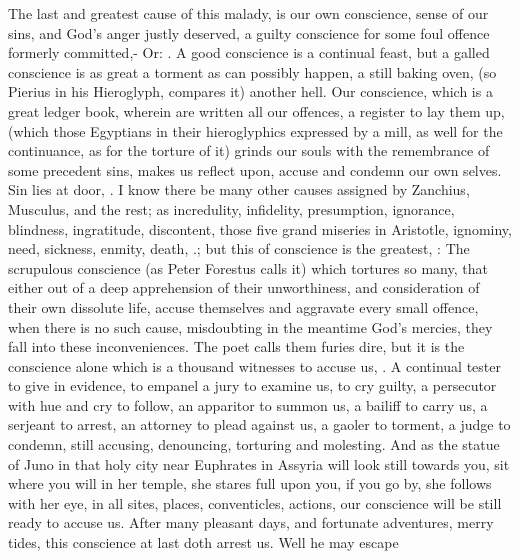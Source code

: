 {The last and greatest cause of this malady, is our own conscience,
sense of our sins, and God's anger justly deserved, a guilty conscience
for some foul offence formerly committed,- Or: . A good conscience is a continual feast, but a galled
conscience is as great a torment as can possibly happen, a still baking
oven, (so Pierius in his Hieroglyph, compares it) another hell. Our
conscience, which is a great ledger book, wherein are written all our
offences, a register to lay them up, (which those Egyptians in
their hieroglyphics expressed by a mill, as well for the continuance,
as for the torture of it) grinds our souls with the remembrance of some
precedent sins, makes us reflect upon, accuse and condemn our own
selves. Sin lies at door, \etc{}. I know there be many other causes
assigned by Zanchius, Musculus, and the rest; as incredulity,
infidelity, presumption, ignorance, blindness, ingratitude, discontent,
those five grand miseries in Aristotle, ignominy, need, sickness,
enmity, death, \etc{}.; but this of conscience is the greatest,
: The scrupulous
conscience (as Peter Forestus calls it) which tortures so many,
that either out of a deep apprehension of their unworthiness, and
consideration of their own dissolute life, accuse themselves and
aggravate every small offence, when there is no such cause, misdoubting
in the meantime God's mercies, they fall into these inconveniences. The
poet calls them furies dire, but it is the conscience alone which
is a thousand witnesses to accuse us,  . A continual tester to give in evidence, to empanel a
jury to examine us, to cry guilty, a persecutor with hue and cry to
follow, an apparitor to summon us, a bailiff to carry us, a serjeant to
arrest, an attorney to plead against us, a gaoler to torment, a judge
to condemn, still accusing, denouncing, torturing and molesting. And as
the statue of Juno in that holy city near Euphrates in Assyria
will look still towards you, sit where you will in her temple, she
stares full upon you, if you go by, she follows with her eye, in all
sites, places, conventicles, actions, our conscience will be still
ready to accuse us. After many pleasant days, and fortunate adventures,
merry tides, this conscience at last doth arrest us. Well he may escape
}
